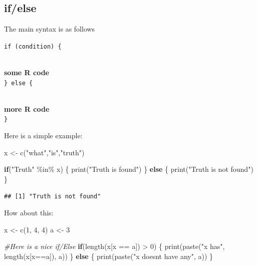 \documentclass[
]{book}
\newenvironment{Shaded}{\begin{snugshade}}{\end{snugshade}}
\newcommand{\CommentTok}[1]{\textcolor[rgb]{0.56,0.35,0.01}{\textit{#1}}}
\newcommand{\ControlFlowTok}[1]{\textcolor[rgb]{0.13,0.29,0.53}{\textbf{#1}}}
\newcommand{\DecValTok}[1]{\textcolor[rgb]{0.00,0.00,0.81}{#1}}
\newcommand{\FunctionTok}[1]{\textcolor[rgb]{0.00,0.00,0.00}{#1}}
\newcommand{\NormalTok}[1]{#1}
\newcommand{\OtherTok}[1]{\textcolor[rgb]{0.56,0.35,0.01}{#1}}
\newcommand{\SpecialCharTok}[1]{\textcolor[rgb]{0.00,0.00,0.00}{#1}}
\newcommand{\StringTok}[1]{\textcolor[rgb]{0.31,0.60,0.02}{#1}}
\begin{document}
\hypertarget{ifelse}{%
\subsection{if/else}\label{ifelse}}

The main syntax is as follows

\texttt{if\ (condition)\ \{}\strut \\
\textbf{some R code}\\
\texttt{\}\ else\ \{}\strut \\
\textbf{more R code}\\
\texttt{\}}

Here is a simple example:

\begin{Shaded}
\begin{Highlighting}[]
\NormalTok{x }\OtherTok{\textless{}{-}} \FunctionTok{c}\NormalTok{(}\StringTok{"what"}\NormalTok{,}\StringTok{"is"}\NormalTok{,}\StringTok{"truth"}\NormalTok{)}

\ControlFlowTok{if}\NormalTok{(}\StringTok{"Truth"} \SpecialCharTok{\%in\%}\NormalTok{ x) \{}
   \FunctionTok{print}\NormalTok{(}\StringTok{"Truth is found"}\NormalTok{)}
\NormalTok{\} }\ControlFlowTok{else}\NormalTok{ \{}
   \FunctionTok{print}\NormalTok{(}\StringTok{"Truth is not found"}\NormalTok{)}
\NormalTok{\}}
\end{Highlighting}
\end{Shaded}

\begin{verbatim}
## [1] "Truth is not found"
\end{verbatim}

How about this:

\begin{Shaded}
\begin{Highlighting}[]
\NormalTok{x }\OtherTok{\textless{}{-}} \FunctionTok{c}\NormalTok{(}\DecValTok{1}\NormalTok{, }\DecValTok{4}\NormalTok{, }\DecValTok{4}\NormalTok{)}
\NormalTok{a }\OtherTok{\textless{}{-}} \DecValTok{3}

\CommentTok{\#Here is a nice if/Else}
\ControlFlowTok{if}\NormalTok{(}\FunctionTok{length}\NormalTok{(x[x }\SpecialCharTok{==}\NormalTok{ a]) }\SpecialCharTok{\textgreater{}} \DecValTok{0}\NormalTok{) \{}
  \FunctionTok{print}\NormalTok{(}\FunctionTok{paste}\NormalTok{(}\StringTok{"x has"}\NormalTok{, }\FunctionTok{length}\NormalTok{(x[x}\SpecialCharTok{==}\NormalTok{a]), a))}
\NormalTok{\} }\ControlFlowTok{else}\NormalTok{ \{}
  \FunctionTok{print}\NormalTok{(}\FunctionTok{paste}\NormalTok{(}\StringTok{"x doesn\textquotesingle{}t have any"}\NormalTok{, a))}
\NormalTok{\}}
\end{Highlighting}
\end{Shaded}
\end{document}
